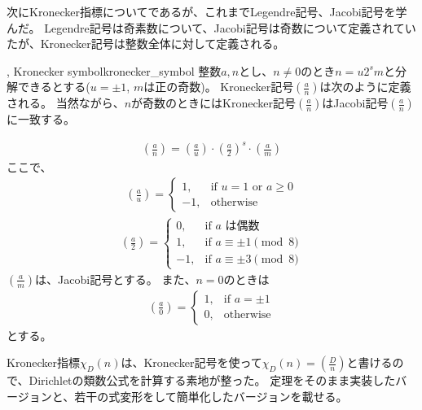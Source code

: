 次にKronecker指標についてであるが、これまでLegendre記号、Jacobi記号を学んだ。
Legendre記号は奇素数について、Jacobi記号は奇数について定義されていたが、Kronecker記号は整数全体に対して定義される。

\begin{Defi}{, Kronecker symbol}{kronecker_symbol}
整数$a,n$とし、$n\neq0$のとき$n=u2^sm$と分解できるとする($u=\pm1$, $m$は正の奇数)。
Kronecker記号$\left(\frac{a}{n}\right)$は次のように定義される。
当然ながら、$n$が奇数のときにはKronecker記号$\left(\frac{a}{n}\right)$はJacobi記号$\left(\frac{a}{n}\right)$に一致する。

\begin{align*}
\left(\frac{a}{n}\right) = \left(\frac{a}{u}\right)\cdot \left(\frac{a}{2}\right)^s \cdot\left(\frac{a}{m}\right)
\end{align*}
ここで、
\begin{align*}
\left(\frac{a}{u}\right) = 
\begin{cases}
1, & \mbox{if } u = 1 \mbox{ or } a \ge 0\\
-1, & \mbox{otherwise}
\end{cases}
\end{align*}
\begin{align*}
\left(\frac{a}{2}\right) = 
\begin{cases}
0, & \mbox{if } a \mbox{ は偶数}\\
1, & \mbox{if } a \equiv \pm 1 \pmod{8}\\
-1, & \mbox{if } a \equiv \pm 3 \pmod{8}
\end{cases}
\end{align*}
$\left(\frac{a}{m}\right)$は、Jacobi記号とする。
また、$n=0$のときは
\begin{align*}
\left(\frac{a}{0}\right) = 
\begin{cases}
1, & \mbox{if } a = \pm 1\\
0, & \mbox{otherwise}
\end{cases}
\end{align*}
とする。
\end{Defi}


Kronecker指標$\chi_D(n)$は、Kronecker記号を使って$\chi_D(n)=\left(\frac{D}{n}\right)$と書けるので、Dirichletの類数公式を計算する素地が整った。
定理をそのまま実装したバージョンと、若干の式変形をして簡単化したバージョンを載せる。

